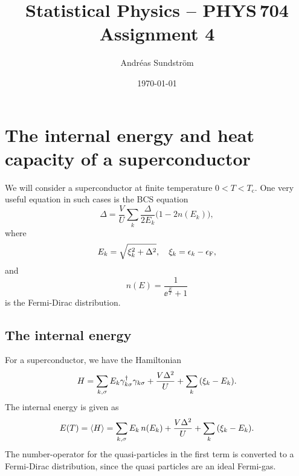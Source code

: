 \documentclass[11pt,letter, swedish, english
]{article}
\newcommand{\Tc}{\ensuremath{T_{\text{c}}}}
\newcommand{\eF}{\ensuremath{\epsilon_{\text{F}}}}
\begin{document}




\title{Statistical Physics -- PHYS\,704 \\
Assignment 4}
\author{Andréas Sundström}
\date{\today}

\maketitle


\section{The internal energy and heat capacity of a superconductor}
We will consider a superconductor at finite temperature $0<T<\Tc$. One
very useful equation in such cases is the BCS equation
\begin{equation}\label{eq:BCS}
\Delta=\frac{V}{U}\sum_k \frac{\Delta}{2E_k}\Big(1-2n(E_k)\Big),
\end{equation}
where
\begin{equation}
E_k=\sqrt{\xi_k^2+\Delta^2}\qcomma \xi_k=\epsilon_k-\eF,
\end{equation}
and
\begin{equation}\label{eq:nFD}
n(E)=\frac{1}{\ee^{\frac{E}{T}}+1}
\end{equation}
is the Fermi-Dirac distribution.

\subsection{The internal energy}
For a superconductor, we have the Hamiltonian
\begin{equation}
H=\sum_{k, \sigma} E_k\gamma_{k \sigma}^\dagger\gamma_{k \sigma}
+\frac{V\Delta^2}{U}+\sum_k\qty(\xi_k-E_k).
\end{equation}
The internal energy is given as
\begin{equation}\label{eq:1a_E0}
E(T)=\ev{H}=
\sum_{k, \sigma} E_k\,n(E_k)
+\frac{V\Delta^2}{U}+\sum_k\qty(\xi_k-E_k).
\end{equation}
The number-operator for the quasi-particles in the first term is
converted to a Fermi-Dirac distribution, since the quasi particles are
an ideal Fermi-gas. 
\end{document}
